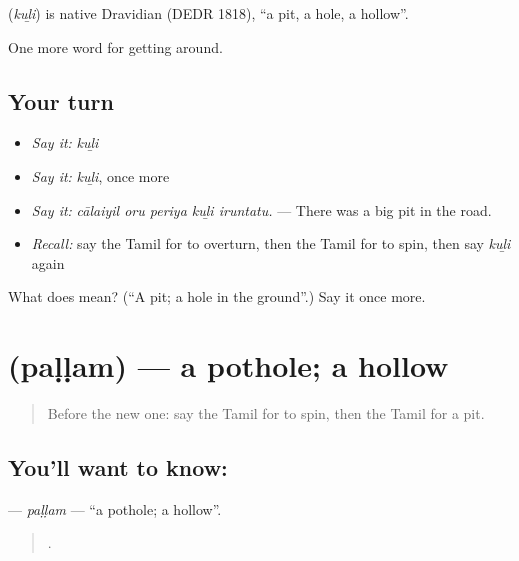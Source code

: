 \begin{cousinweb}
\textbf{} (\emph{kuḻi}) is native Dravidian (DEDR 1818), \textquotedblleft{}a pit, a hole, a hollow\textquotedblright{}.
\end{cousinweb}

\begin{grammarlens}[title={What you've built}]
One more word for getting around.
\end{grammarlens}

\subsection*{Your turn}
\begin{itemize}
\raggedright
  \item \emph{Say it:} \emph{kuḻi}
  \item \emph{Say it:} \emph{kuḻi}, once more
  \item \emph{Say it:} \emph{cālaiyil oru periya kuḻi iruntatu.} — There was a big pit in the road.
  \item \emph{Recall:} say the Tamil for to overturn, then the Tamil for to spin, then say \emph{kuḻi} again
\end{itemize}

\begin{tcolorbox}[breakable,colback=teal!4,colframe=teal!35!black,title={Before you move on}]
What does  mean? (\textquotedblleft{}A pit; a hole in the ground\textquotedblright{}.) Say it once more.
\end{tcolorbox}
\section[\texorpdfstring{\ta{பள்ளம்} (paḷḷam)}{பள்ளம் (paḷḷam)}]{ (paḷḷam) — a pothole; a hollow}

\label{lesson:TA-C409-pallam}



\begin{quote}
Before the new one: say the Tamil for to spin, then the Tamil for a pit.
\end{quote}

\subsection*{You'll want to know: }
\textbf{} — \emph{paḷḷam} — \textquotedblleft{}a pothole; a hollow\textquotedblright{}.

\begin{quote}
    .
\end{quote}

